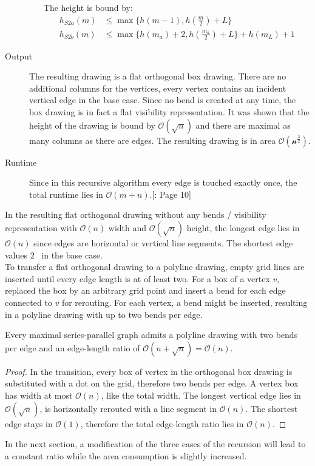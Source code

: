 \begin{description}
\begin{itemize}
		The height is bound by:
		\begin{align}
			h_{S2a}(m)&\leq \max\{h(m-1),h\left(\frac{m}{2}\right)+L\}\\
			h_{S2b}(m)&\leq \max\{h(m_a)+2,h\left(\frac{m_a}{2}\right)+L\}+h(m_L)+1
		\end{align}
	\end{itemize}
	\item[Output] The resulting drawing is a flat orthogonal box drawing. There are no additional columns for the vertices, every vertex contains an incident vertical edge in the base case. Since no bend is created at any time, the box drawing is in fact a flat visibility representation. It was shown that the height of the drawing is bound by $\mathcal{O}(\sqrt{n})$ and there are maximal as many columns as there are edges. The resulting drawing is in area $\mathcal{O(n^{\frac{3}{2}})}$.
	\item[Runtime] Since in this recursive algorithm every edge is touched exactly once, the total runtime lies in $\mathcal{O}(m+n)$.[\cite{DBLP:journals/dcg/Biedl11}: Page 10]
\end{description}

In the resulting flat orthogonal drawing without any bends / visibility representation with $\mathcal{O}(n)$ width and $\mathcal{O}(\sqrt{n})$ height, the longest edge lies in $\mathcal{O}(n)$ since edges are horizontal or vertical line segments. The shortest edge values 2 \UL~in the base case.
\bigskip\\
To transfer a flat orthogonal drawing to a polyline drawing, empty grid lines are inserted until every edge length is at of least two. For a box of a vertex $v$, replaced the box by an arbitrary grid point and insert a bend for each edge connected to $v$ for rerouting. For each vertex, a bend might be inserted, resulting in a polyline drawing with up to two bends per edge.
\begin{lemma}
	Every maximal series-parallel graph admits a polyline drawing with two bends per edge and an edge-length ratio of $\mathcal{O}(n + \sqrt{n}) = \mathcal{O}(n)$.
\end{lemma}
\begin{proof}
	In the transition, every box of vertex in the orthogonal box drawing is substituted with a dot on the grid, therefore two bends per edge. A vertex box has width at most $\mathcal{O}(n)$, like the total width. The longest vertical edge lies in $\mathcal{O}(\sqrt{n})$, is horizontally rerouted with a line segment in $\mathcal{O}(n)$. The shortest edge stays in $\mathcal{O}(1)$, therefore the total edge-length ratio lies in $\mathcal{O}(n)$.
\end{proof}
In the next section, a modification of the three cases of the recursion will lead to a constant ratio while the area consumption is slightly increased.
